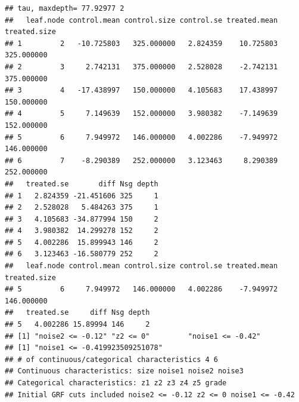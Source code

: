 \begin{knitrout}
\begin{kframe}
\begin{alltt}
 \hlkwb{<-} \hlstd{(}     \hlstd{=} \hlstd{,}
           \hlstd{=} \hlstd{,}
         
           
           
       
         \hlstd{=} \hlstd{,}  \hlstd{=} \hlstd{,}  
\end{alltt}
\begin{verbatim}
## tau, maxdepth= 77.92977 2 
##   leaf.node control.mean control.size control.se treated.mean treated.size
## 1         2   -10.725803   325.000000   2.824359    10.725803   325.000000
## 2         3     2.742131   375.000000   2.528028    -2.742131   375.000000
## 3         4   -17.438997   150.000000   4.105683    17.438997   150.000000
## 4         5     7.149639   152.000000   3.980382    -7.149639   152.000000
## 5         6     7.949972   146.000000   4.002286    -7.949972   146.000000
## 6         7    -8.290389   252.000000   3.123463     8.290389   252.000000
##   treated.se       diff Nsg depth
## 1   2.824359 -21.451606 325     1
## 2   2.528028   5.484263 375     1
## 3   4.105683 -34.877994 150     2
## 4   3.980382  14.299278 152     2
## 5   4.002286  15.899943 146     2
## 6   3.123463 -16.580779 252     2
##   leaf.node control.mean control.size control.se treated.mean treated.size
## 5         6     7.949972   146.000000   4.002286    -7.949972   146.000000
##   treated.se     diff Nsg depth
## 5   4.002286 15.89994 146     2
## [1] "noise2 <= -0.12" "z2 <= 0"         "noise1 <= -0.42"
## [1] "noise1 <= -0.419923509251078"
## # of continuous/categorical characteristics 4 6 
## Continuous characteristics: size noise1 noise2 noise3 
## Categorical characteristics: z1 z2 z3 z4 z5 grade 
## Initial GRF cuts included noise2 <= -0.12 z2 <= 0 noise1 <= -0.42 

\end{verbatim}
\end{kframe}
\end{knitrout}
